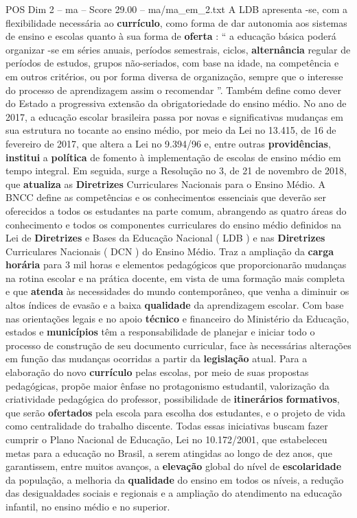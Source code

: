 \begin{textsample}{POS Dim 2 – ma – Score 29.00 – ma/ma\_em\_2.txt}
A LDB apresenta -se, com a flexibilidade necessária ao \textbf{currículo}, como forma de dar autonomia aos sistemas de ensino e escolas quanto à sua forma de \textbf{oferta} : “ a educação básica poderá organizar -se em séries anuais, períodos semestrais, ciclos, \textbf{alternância} regular de períodos de estudos, grupos não-seriados, com base na idade, na competência e em outros critérios, ou por forma diversa de organização, sempre que o interesse do processo de aprendizagem assim o recomendar ”.
Também define como dever do Estado a progressiva extensão da obrigatoriedade do ensino médio.
No ano de 2017, a educação escolar brasileira passa por novas e significativas mudanças em sua estrutura no tocante ao ensino médio, por meio da Lei no 13.415, de 16 de fevereiro de 2017, que altera a Lei no 9.394/96 e, entre outras \textbf{providências}, \textbf{institui} a \textbf{política} de fomento à implementação de escolas de ensino médio em tempo integral.
Em seguida, surge a Resolução no 3, de 21 de novembro de 2018, que \textbf{atualiza} as \textbf{Diretrizes} Curriculares Nacionais para o Ensino Médio.
A BNCC define as competências e os conhecimentos essenciais que deverão ser oferecidos a todos os estudantes na parte comum, abrangendo as quatro áreas do conhecimento e todos os componentes curriculares do ensino médio definidos na Lei de \textbf{Diretrizes} e Bases da Educação Nacional ( LDB ) e nas \textbf{Diretrizes} Curriculares Nacionais ( DCN ) do Ensino Médio.
Traz a ampliação da \textbf{carga} \textbf{horária} para 3 mil horas e elementos pedagógicos que proporcionarão mudanças na rotina escolar e na prática docente, em vista de uma formação mais completa e que \textbf{atenda} às necessidades do mundo contemporâneo, que venha a diminuir os altos índices de evasão e a baixa \textbf{qualidade} da aprendizagem escolar.
Com base nas orientações legais e no apoio \textbf{técnico} e financeiro do Ministério da Educação, estados e \textbf{municípios} têm a responsabilidade de planejar e iniciar todo o processo de construção de seu documento curricular, face às necessárias alterações em função das mudanças ocorridas a partir da \textbf{legislação} atual.
Para a elaboração do novo \textbf{currículo} pelas escolas, por meio de suas propostas pedagógicas, propõe maior ênfase no protagonismo estudantil, valorização da criatividade pedagógica do professor, possibilidade de \textbf{itinerários} \textbf{formativos}, que serão \textbf{ofertados} pela escola para escolha dos estudantes, e o projeto de vida como centralidade do trabalho discente.
Todas essas iniciativas buscam fazer cumprir o Plano Nacional de Educação, Lei no 10.172/2001, que estabeleceu metas para a educação no Brasil, a serem atingidas ao longo de dez anos, que garantissem, entre muitos avanços, a \textbf{elevação} global do nível de \textbf{escolaridade} da população, a melhoria da \textbf{qualidade} do ensino em todos os níveis, a redução das desigualdades sociais e regionais e a ampliação do atendimento na educação infantil, no ensino médio e no superior.

\end{textsample}
